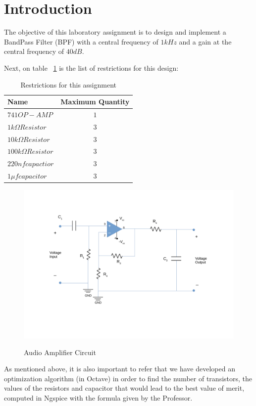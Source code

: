 \newpage
\section{Introduction}
\label{sec:introduction}

The objective of this laboratory assignment is to design and implement a BandPass Filter (BPF) with a central frequency of $1kHz$ and a gain at the central frequency of $40dB$.

Next, on table ~\ref{tab:restrictions} is the list of restrictions for this design:

\begin{table}[h]
    \centering
    \begin{tabular}{|l|c|}
    \hline
    {\bf Name} & {\bf Maximum Quantity} \\ \hline
    $741 OP-AMP$ & $1$ \\ \hline
    $1k{\Omega} Resistor$ & $3$ \\ \hline
    $10k{\Omega}Resistor$ & $3$ \\ \hline
    $100k{\Omega} Resistor$ & $3$ \\ \hline
    $220nf  capactior$ & $3$ \\ \hline
    $1{\mu}f  capacitor$ & $3$ \\ \hline
    \end{tabular}
    \caption{Restrictions for this assignment}
    \label{tab:restrictions}
\end{table}


\begin{figure}[!ht] \centering

\caption{Audio Amplifier Circuit}
\squeezeup
\squeezeup



\includegraphics[width=1\textwidth, scale=1.0]{DesenhoT5.pdf}  
\squeezeup
\squeezeup
\squeezeup
\squeezeup
\squeezeup
\squeezeup
\label{fig:circuit}
\end{figure}

As mentioned above, it is also important to refer that we have developed an optimization algorithm (in Octave) in order to find the number of transistors, the values of the resistors and capacitor that would lead to the best value of merit, computed in Ngspice with the formula given by the Professor.   

